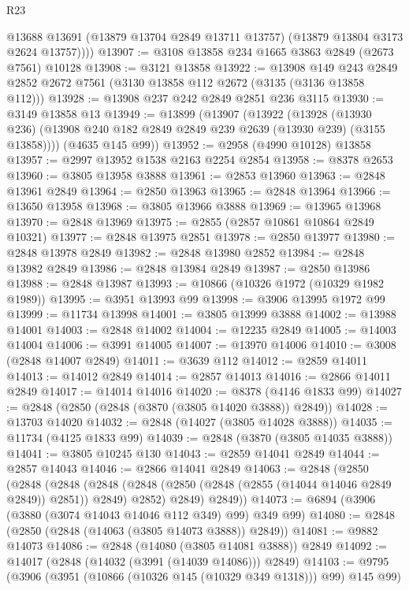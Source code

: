 \begin{lexlean}{R23}
\begin{coremodule}
          @13688
          @13691
          (@13879 @13704 @2849 @13711 @13757)
          (@13879 @13804 @3173 @2624 @13757))))
@13907 := @3108 @13858 @234 @1665 @3863 @2849 (@2673 @7561) @10128
@13908 := @3121 @13858
@13922 := @13908
    @149
    @243
    @2849
    @2852
    @2672
    @7561
    (@3130 @13858 @112 @2672 (@3135 (@3136 @13858 @112)))
@13928 := @13908 @237 @242 @2849 @2851 @236 @3115
@13930 := @3149 @13858 @13
@13949 := @13899
    (@13907
      (@13922
        (@13928
          (@13930 @236)
          (@13908 @240 @182 @2849 @2849 @239 @2639 (@13930 @239) (@3155 @13858))))
      (@4635 @145 @99))
@13952 := @2958 (@4990 @10128) @13858
@13957 := @2997 @13952 @1538 @2163 @2254 @2854
@13958 := @8378 @2653
@13960 := @3805 @13958 @3888
@13961 := @2853 @13960
@13963 := @2848 @13961 @2849
@13964 := @2850 @13963
@13965 := @2848 @13964
@13966 := @13650 @13958
@13968 := @3805 @13966 @3888
@13969 := @13965 @13968
@13970 := @2848 @13969
@13975 := @2855 (@2857 @10861 @10864 @2849 @10321)
@13977 := @2848 @13975 @2851
@13978 := @2850 @13977
@13980 := @2848 @13978 @2849
@13982 := @2848 @13980 @2852
@13984 := @2848 @13982 @2849
@13986 := @2848 @13984 @2849
@13987 := @2850 @13986
@13988 := @2848 @13987
@13993 := @10866 (@10326 @1972 (@10329 @1982 @1989))
@13995 := @3951 @13993 @99
@13998 := @3906 @13995 @1972 @99
@13999 := @11734 @13998
@14001 := @3805 @13999 @3888
@14002 := @13988 @14001
@14003 := @2848 @14002
@14004 := @12235 @2849
@14005 := @14003 @14004
@14006 := @3991 @14005
@14007 := @13970 @14006
@14010 := @3008 (@2848 @14007 @2849)
@14011 := @3639 @112
@14012 := @2859 @14011
@14013 := @14012 @2849
@14014 := @2857 @14013
@14016 := @2866 @14011 @2849
@14017 := @14014 @14016
@14020 := @8378 (@4146 @1833 @99)
@14027 := @2848 (@2850 (@2848 (@3870 (@3805 @14020 @3888)) @2849))
@14028 := @13703 @14020
@14032 := @2848 (@14027 (@3805 @14028 @3888))
@14035 := @11734 (@4125 @1833 @99)
@14039 := @2848 (@3870 (@3805 @14035 @3888))
@14041 := @3805 @10245 @130
@14043 := @2859 @14041 @2849
@14044 := @2857 @14043
@14046 := @2866 @14041 @2849
@14063 := @2848
    (@2850
      (@2848
        (@2848
          (@2848 (@2848 (@2850 (@2848 (@2855 (@14044 @14046 @2849 @2849)) @2851)) @2849) @2852)
          @2849)
        @2849))
@14073 := @6894 (@3906 (@3880 (@3074 @14043 @14046 @112 @349) @99) @349 @99)
@14080 := @2848 (@2850 (@2848 (@14063 (@3805 @14073 @3888)) @2849))
@14081 := @9882 @14073
@14086 := @2848 (@14080 (@3805 @14081 @3888)) @2849
@14092 := @14017 (@2848 (@14032 (@3991 (@14039 @14086))) @2849)
@14103 := @9795 (@3906 (@3951 (@10866 (@10326 @145 (@10329 @349 @1318))) @99) @145 @99)

\end{coremodule}
\end{lexlean}
